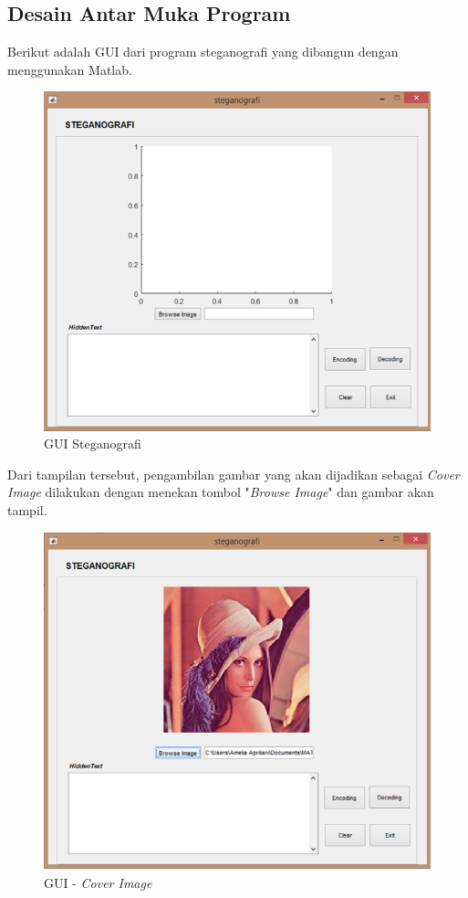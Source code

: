 	\subsection{Desain Antar Muka Program}
	
	Berikut adalah GUI dari program steganografi yang dibangun dengan menggunakan Matlab.
	
	\begin{figure}[H]
		\centering
		\includegraphics[width=1\textwidth]{gambar/mockup/1}
		\caption{GUI Steganografi}
		\label{desain_form}
	\end{figure}

	Dari tampilan tersebut, pengambilan gambar yang akan dijadikan sebagai \emph{Cover Image} dilakukan dengan menekan tombol "\emph{Browse Image}" dan gambar akan tampil. 
	
	\begin{figure}[H]
		\centering
		\includegraphics[width=1\textwidth]{gambar/mockup/2}
		\caption{GUI - \emph{Cover Image}}
		\label{desain_image}
	\end{figure}

